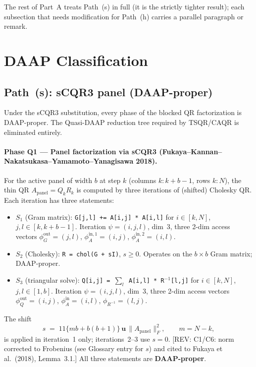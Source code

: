 \documentclass[11pt]{article}
\newcommand{\REV}[1]{\textcolor{blue!60!black}{\small\textsf{[REV: #1]}}}
\begin{document}
The rest of Part~A treats Path~(s) in full (it is the strictly tighter
result); each subsection that needs modification for Path~(h)
carries a parallel paragraph or remark.

\section{DAAP Classification}
\label{sec:A1-DAAP}

\subsection*{Path~(s): sCQR3 panel (DAAP-proper)}

Under the sCQR3 substitution, every phase of the blocked QR factorization
is DAAP-proper. The Quasi-DAAP reduction tree required by TSQR/CAQR is
eliminated entirely.

\paragraph{Phase Q1 --- Panel factorization via sCQR3 (Fukaya--Kannan--Nakatsukasa--Yamamoto--Yanagisawa 2018).}
For the active panel of width $b$ at step $k$ (columns $k\!:\!k{+}b{-}1$,
rows $k\!:\!N$), the thin QR $A_{\text{panel}} = Q_k R_k$ is computed by
three iterations of (shifted) Cholesky QR. Each iteration has three
statements:
\begin{itemize}[leftmargin=2em]
  \item $S_1$ (Gram matrix): \texttt{G[j,l] += A[i,j] * A[i,l]} for
    $i \in [k,N]$, $j,l \in [k, k{+}b{-}1]$.
        Iteration $\psi = (i,j,l)$, dim~3, three 2-dim access vectors
        $\phi^{\mathrm{out}}_G = (j,l)$,
        $\phi^{\mathrm{in},1}_A = (i,j)$,
        $\phi^{\mathrm{in},2}_A = (i,l)$.
  \item $S_2$ (Cholesky): \texttt{R = chol(G + sI)}, $s \ge 0$.
        Operates on the $b \times b$ Gram matrix; DAAP-proper.
  \item $S_3$ (triangular solve):
        \texttt{Q[i,j] = $\sum_l$ A[i,l] * R$^{-1}$[l,j]} for
        $i \in [k,N]$, $j,l \in [1,b]$.
        Iteration $\psi = (i,j,l)$, dim~3, three 2-dim access vectors
        $\phi^{\mathrm{out}}_Q = (i,j)$,
        $\phi^{\mathrm{in}}_A = (i,l)$,
        $\phi_{R^{-1}} = (l,j)$.
\end{itemize}
The shift
\[
  s \;=\; 11\big\{m b + b(b{+}1)\big\}\,\mathbf{u}\,
            \|A_{\text{panel}}\|_F^2,
  \qquad m = N-k,
\]
is applied in iteration~1 only; iterations~2--3 use $s = 0$.
\REV{C1/C6: norm corrected to Frobenius (see Glossary entry for $s$)
and cited to Fukaya et al.\ (2018), Lemma~3.1.} All three statements are
\textbf{DAAP-proper}.
\end{document}
